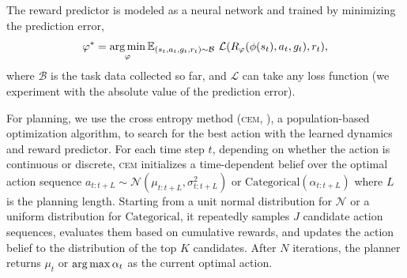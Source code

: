 The reward predictor is modeled as a neural network and trained by minimizing the prediction error,
\begin{equation}
    \varphi^* = \argmin_\varphi \mathbb{E}_{(s_t, a_t, g_t, r_t) \sim \mathcal{B}} \ \mathcal{L}(R_\varphi(\phi(s_t), a_t, g_t), r_t),
    \label{eq:reward_loss}
\end{equation}
where $\mathcal{B}$ is the task data collected so far, and $\mathcal{L}$ can take any loss function (we experiment with the absolute value of the prediction error).

For planning, we use the cross entropy method (\textsc{cem}, \citet{rubinstein1997optimization}), a population-based optimization algorithm, to search for the best action with the learned dynamics and reward predictor. For each time step $t$, depending on whether the action is continuous or discrete, \textsc{cem} initializes a time-dependent belief over the optimal action sequence $a_{t:t+L} \sim \mathcal{N}(\mu_{t:t+L}, \sigma^2_{t:t+L})$ or $\text{Categorical}(\alpha_{t:t+L})$ where $L$ is the planning length. Starting from a unit normal distribution for $\mathcal{N}$ or a uniform distribution for $\text{Categorical}$, it repeatedly samples $J$ candidate action sequences, evaluates them based on cumulative rewards, and updates the action belief to the distribution of the top $K$ candidates. After $N$ iterations, the planner returns $\mu_t$ or $\operatorname*{arg\,max} \alpha_t$ as the current optimal action.
